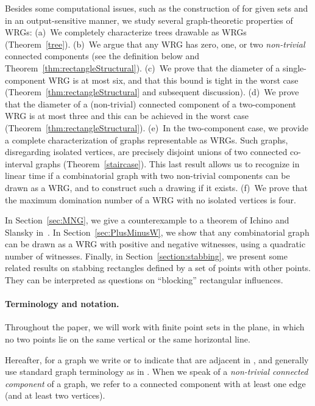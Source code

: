 \documentclass{llncs}
\begin{document}
Besides some computational issues, such as the construction of  for given sets 
and  in an output-sensitive manner, we study several graph-theoretic properties of WRGs: (a)~We
completely characterize trees drawable as WRGs (Theorem~\ref{tree}).
(b)~We argue that any WRG has zero, one, or two \emph{non-trivial} connected
components (see the definition below and Theorem~\ref{thm:rectangleStructural}). (c)~We prove
that the diameter of a single-component WRG is at most six, and that this bound is tight in the worst case
(Theorem~\ref{thm:rectangleStructural} and subsequent discussion). (d)~We prove that the diameter
of a (non-trivial) connected component of a two-component WRG is at
most three and this can be achieved in the worst case
(Theorem~\ref{thm:rectangleStructural}).
(e)~In the two-component case, we provide a complete characterization
of graphs representable as WRGs. Such graphs, disregarding
isolated vertices, are precisely disjoint unions of two connected co-interval
graphs (Theorem~\ref{staircase}).
This last result allows us to recognize in linear time if a combinatorial graph with two
non-trivial components can be drawn as a WRG, and to construct such a drawing if it exists.
(f)~We prove that the maximum domination number of a WRG with no isolated vertices is four.



In Section~\ref{sec:MNG}, we give a counterexample to a theorem of
Ichino and Slansky in~\cite{MNG}.
In Section~\ref{sec:PlusMinusW}, we show that any combinatorial graph can be drawn as a WRG with positive and negative witnesses, using a quadratic number of witnesses.
Finally, in Section~\ref{section:stabbing}, we present some related
results on stabbing rectangles defined by a set of points with other
points.  They can be interpreted as questions on ``blocking''
rectangular influences.

\paragraph*{Terminology and notation.}
Throughout the paper, we will work with finite point sets in the
plane, in which no two points lie on the same vertical or the same
horizontal line.

Hereafter, for a graph  we write  or  to
indicate that  are adjacent in , and generally use
standard graph terminology as in \cite{CL04}.
When we speak of a \emph{non-trivial connected component} of a graph,
we refer to a connected component with at least one edge (and at least
two vertices).
\end{document}
